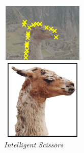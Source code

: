 \begin{figure}[H]
\begin{subfigure}{0.3\textwidth}
      \includegraphics[width=\textwidth]{gambar/gambar-2_5(b).png}
      \caption{\emph{Intelligent Scissors}}
    \end{subfigure}  
    \begin{subfigure}{0.3\textwidth}
      \centering{}

\end{subfigure}
\end{figure}
